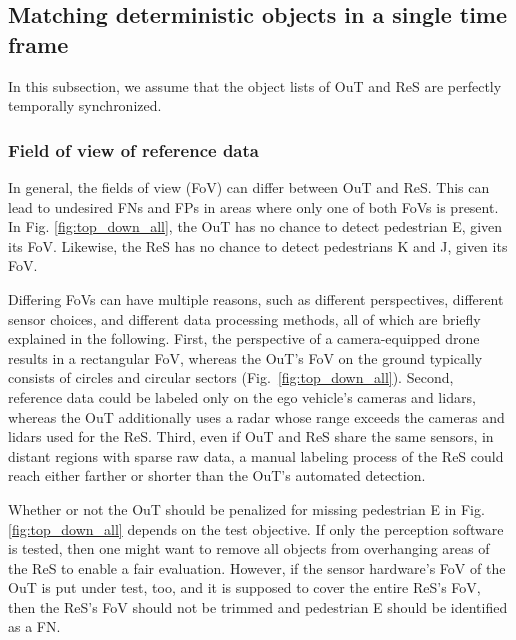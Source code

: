\documentclass[conference]{IEEEtran}
\begin{document}

\subsection{Matching deterministic objects in a single time frame}
\label{sec:oracle_simple}

In this subsection, we assume that the object lists of OuT and ReS are perfectly temporally synchronized. 

\subsubsection{Field of view of reference data}
\label{sec:fov_ref}
In general, the fields of view (FoV) can differ between OuT and ReS. This can lead to undesired FNs and FPs in areas where only one of both FoVs is present. 
In Fig. \ref{fig:top_down_all}, the OuT has no chance to detect pedestrian E, given its FoV. 
Likewise, the ReS has no chance to detect pedestrians K and J, given its FoV. 

Differing FoVs can have multiple reasons, such as different perspectives, different sensor choices, and different data processing methods, all of which are briefly explained in the following.
First, the perspective of a camera-equipped drone results in a rectangular FoV, whereas the OuT's FoV on the ground typically consists of circles and circular sectors (Fig.~\ref{fig:top_down_all}).
Second, reference data could be labeled only on the ego vehicle's cameras and lidars, whereas the OuT additionally uses a radar whose range exceeds the cameras and lidars used for the ReS. 
Third, even if OuT and ReS share the same sensors, in distant regions with sparse raw data, a manual labeling process of the ReS could reach either farther or shorter than the OuT's automated detection.

Whether or not the OuT should be penalized for missing pedestrian E in Fig. \ref{fig:top_down_all} depends on the test objective. 
If only the perception software is tested, then one might want to remove all objects from overhanging areas of the ReS to enable a fair evaluation.
However, if the sensor hardware's FoV of the OuT is put under test, too, and it is supposed to cover the entire ReS's FoV, then the ReS's FoV should not be trimmed and pedestrian E should be identified as a FN. 
\end{document}
